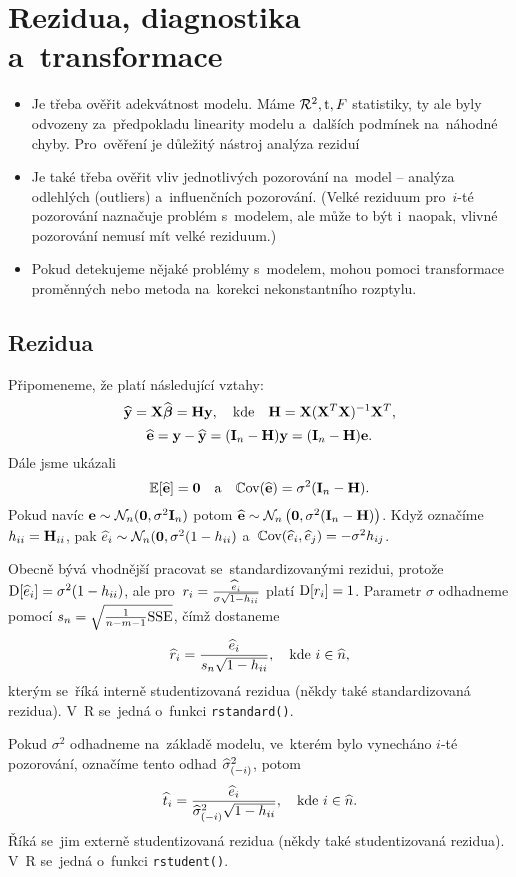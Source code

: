 \chapter{Rezidua, diagnostika a~transformace}
\begin{itemize}
 \item Je třeba ověřit adekvátnost modelu. Máme $\mathcal{R}^2, \mathrm{t}, F$ statistiky, ty ale byly odvozeny za~předpokladu linearity modelu a~dalších podmínek na~náhodné chyby. Pro~ověření je důležitý nástroj analýza reziduí
 \item Je také třeba ověřit vliv jednotlivých pozorování na~model -- analýza odlehlých (outliers) a~influenčních pozorování. (Velké reziduum pro~$i$-té pozorování naznačuje problém s~modelem, ale může to být i~naopak, vlivné pozorování nemusí mít velké reziduum.)
 \item Pokud detekujeme nějaké problémy s~modelem, mohou pomoci transformace proměnných nebo metoda na~korekci nekonstantního rozptylu.
\end{itemize}
\section{Rezidua}
Připomeneme, že platí následující vztahy:
 $$
 \widehat{\mathbf{y}} = \mathbf{X} \widehat{\boldsymbol{\beta}} = \textbf{H} \mathbf{y}, \quad \text{kde} \quad \textbf{H} = \mathbf{X} (\mathbf{X}^T \mathbf{X})^{-1} \mathbf{X}^T,
 $$
 $$
 \widehat{\mathbf{e}} = \mathbf{y} - \widehat{\mathbf{y}} = (\textbf{I}_{n} - \textbf{H}) \mathbf{y} = (\textbf{I}_{n} - \textbf{H}) \mathbf{e}.
 $$
Dále jsme ukázali
 $$
\mathbb{E} [\widehat{\mathbf{e}}] = \boldsymbol{0} \quad \text{a} \quad \mathbb{C}\mathrm{ov}(\widehat{\mathbf{e}}) = \sigma^2 (\textbf{I}_{n} - \textbf{H}).
 $$
Pokud navíc
$\mathbf{e} \sim \mathcal{N}_n (\boldsymbol{0},\sigma^2 \textbf{I}_{n})$ potom $\widehat{\mathbf{e}} \sim \mathcal{N}_n \left(\boldsymbol{0},\sigma^2 (\textbf{I}_{n} - \textbf{H})\right)$. Když označíme $h_{ii} = \textbf{H}_{ii} $, pak $ \widehat{e}_i \sim \mathcal{N}_n (\boldsymbol{0}, \sigma^2 (1 - h_{ii}) $ a~$ \mathbb{C}\mathrm{ov}(\widehat{e}_i, \widehat{e}_j) = -\sigma^2 h_{ij} $.

Obecně bývá vhodnější pracovat se~standardizovanými rezidui, protože $\mathrm{D} [\widehat{e}_i] = \sigma^2 (1 - h_{ii})$, ale pro~$r_i = \frac{\widehat{e}_i}{\sigma \sqrt{1-h_{ii}}}$ platí $\mathrm{D} [r_i] = 1$.
 Parametr $\sigma$ odhadneme pomocí $s_n = \sqrt{\frac{1}{n-m-1} \mathrm{SSE}}$, čímž dostaneme
 $$
  \widehat{r}_i = \frac{\widehat{e}_i}{s_n \sqrt{1 - h_{ii}}}, \quad \text{kde }  i\in\widehat{n},
 $$
kterým se~říká interně studentizovaná rezidua (někdy také standardizovaná rezidua). V~R se~jedná o~funkci \verb|rstandard()|.

Pokud $\sigma^2$ odhadneme na~základě modelu, ve~kterém bylo vynecháno $i$-té pozorování, označíme tento odhad $\widehat{\sigma}^2_{(-i)}$, potom
 $$
 \widehat{t}_i = \frac{\widehat{e}_i}{  \widehat{\sigma}^2_{(-i)} \sqrt{1 - h_{ii}}}, \quad \text{kde } i\in\widehat{n}.
 $$
 Říká se~jim externě studentizovaná rezidua (někdy také studentizovaná rezidua). V~R se~jedná o~funkci \verb|rstudent()|.
 

